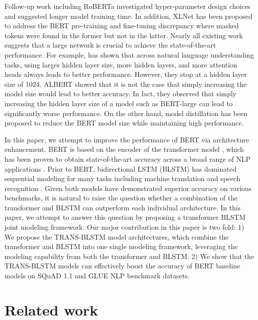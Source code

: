\documentclass[11pt,a4paper]{article}
\begin{document}
Follow-up work including RoBERTa \cite{liu2019-2} investigated hyper-parameter design choices and suggested longer model training time. In addition, XLNet \cite{yang2019} has been proposed to address the BERT pre-training and fine-tuning discrepancy where masked tokens were found in the former but not in the latter. Nearly all existing work suggests that a large network is crucial to achieve the state-of-the-art performance. For example, \cite{devlin2018} has shown that across natural language understanding tasks, using larger hidden layer size, more hidden layers, and more attention heads always leads to better performance. However, they stop at a hidden layer size of 1024. ALBERT \cite{lan2019} showed that it is not the case that simply increasing the model size would lead to better accuracy.  In fact, they observed that simply increasing the hidden layer size of a model such as BERT-large can lead to significantly worse performance. On the other hand, model distillation \cite{hinton2015,tang2019,sun2019,sanh2019} has been proposed to reduce the BERT model size while maintaining high performance.

In this paper, we attempt to improve the performance of BERT via architecture enhancement. BERT is based on the encoder of the transformer model \cite{aswani2017}, which has been proven to obtain state-of-the-art accuracy across a broad range of NLP applications \cite{devlin2018}. Prior to BERT, bidirectional LSTM (BLSTM) has dominated sequential modeling for many tasks including machine translation \cite{chiu2016} and speech recognition \cite{graves2013}. Given both models have demonstrated superior accuracy on various benchmarks, it is natural to raise the question whether a combination of the transformer and BLSTM can outperform each individual architecture. In this paper, we attempt to answer this question by proposing a transformer BLSTM joint modeling framework. Our major contribution in this paper is two fold: 1) We propose the TRANS-BLSTM model architectures, which combine the transformer and BLSTM into one single modeling framework, leveraging the modeling capability from both the transformer and BLSTM. 2) We show that the TRANS-BLSTM models can effectively boost the accuracy of BERT baseline models on SQuAD 1.1 and GLUE NLP benchmark datasets.

\section{Related work}
\end{document}
